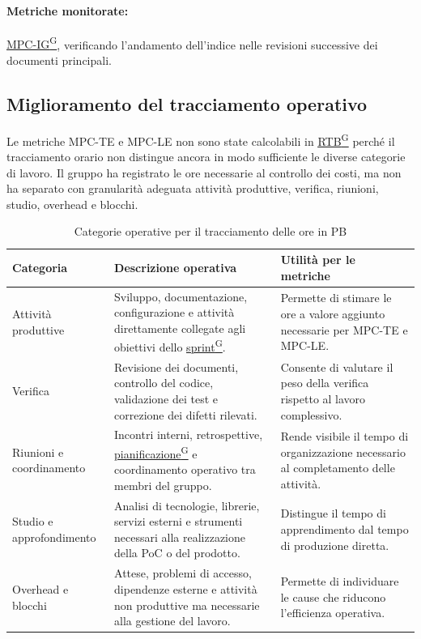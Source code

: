 \documentclass[a4paper,12pt]{article}
\providecommand{\glslink}[2]{\href{https://alittlebyte-19.github.io/Documentazione/glossario.html\#gls-#1}{\underline{#2}\textsuperscript{\scriptsize G}}}
\begin{document}
\paragraph*{Metriche monitorate:} \glslink{indice-di-gulpease-mpc-ig}{MPC-IG}, verificando l'andamento dell'indice nelle revisioni successive dei documenti principali.

\subsection{Miglioramento del tracciamento operativo}

Le metriche MPC-TE e MPC-LE non sono state calcolabili in \glslink{rtb-requirements-and-technology-baseline}{RTB} perché il tracciamento orario non distingue ancora in modo sufficiente le diverse categorie di lavoro. Il gruppo ha registrato le ore necessarie al controllo dei costi, ma non ha separato con granularità adeguata attività produttive, verifica, riunioni, studio, overhead e blocchi.

\begin{table}[H]
    \centering
    \renewcommand{\arraystretch}{1.25}
    \begin{tabularx}{\textwidth}{|p{3.1cm}|X|X|}
        \hline
        \rowcolor{gray!35}
        \textbf{Categoria} & \textbf{Descrizione operativa} & \textbf{Utilità per le metriche} \\
        \hline
        Attività produttive & Sviluppo, documentazione, configurazione e attività direttamente collegate agli obiettivi dello \glslink{sprint}{sprint}. & Permette di stimare le ore a valore aggiunto necessarie per MPC-TE e MPC-LE. \\
        \hline
        Verifica & Revisione dei documenti, controllo del codice, validazione dei test e correzione dei difetti rilevati. & Consente di valutare il peso della verifica rispetto al lavoro complessivo. \\
        \hline
        Riunioni e coordinamento & Incontri interni, retrospettive, \glslink{pianificazione}{pianificazione} e coordinamento operativo tra membri del gruppo. & Rende visibile il tempo di organizzazione necessario al completamento delle attività. \\
        \hline
        Studio e approfondimento & Analisi di tecnologie, librerie, servizi esterni e strumenti necessari alla realizzazione della PoC o del prodotto. & Distingue il tempo di apprendimento dal tempo di produzione diretta. \\
        \hline
        Overhead e blocchi & Attese, problemi di accesso, dipendenze esterne e attività non produttive ma necessarie alla gestione del lavoro. & Permette di individuare le cause che riducono l'efficienza operativa. \\
        \hline
    \end{tabularx}
    \caption{Categorie operative per il tracciamento delle ore in PB}
\end{table}
\end{document}
